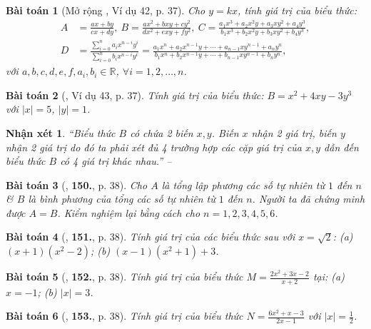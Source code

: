 \documentclass{article}
\numberwithin{equation}{section}
\newtheorem{baitoan}{Bài toán}
\newtheorem{nhanxet}{Nhận xét}[section]
\begin{document}
\begin{baitoan}[Mở rộng \cite{Tuyen_Toan_7}, Ví dụ 42, p. 37]
	\label{mo rong Tuyen_Toan_7 vi du 42}
	Cho $y = kx$, tính giá trị của biểu thức:
	\begin{align*}
		A &= \frac{ax + by}{cx + dy},\ B = \frac{ax^2 + bxy + cy^2}{dx^2 + exy + fy^2},\ C = \frac{a_1x^3 + a_2x^2y + a_3xy^2 + a_4y^3}{b_1x^3 + b_2x^2y + b_3xy^2 + b_4y^3},\\
		D &= \frac{\sum_{i=0}^n a_ix^{n-i}y^i}{\sum_{i=0}^n b_ix^{n-i}y^i} = \frac{a_1x^n + a_2x^{n-1}y + \cdots + a_{n-1}xy^{n-1} + a_ny^n}{b_1x^n + b_2x^{n-1}y + \cdots + b_{n-1}xy^{n-1} + b_ny^n},
	\end{align*}
	với $a,b,c,d,e,f,a_i,b_i\in\mathbb{R}$, $\forall i = 1,2,\ldots,n$.
\end{baitoan}

\begin{baitoan}[\cite{Tuyen_Toan_7}, Ví dụ 43, p. 37]
	Tính giá trị của biểu thức: $B = x^2 + 4xy - 3y^3$ với $|x| = 5$, $|y| = 1$.
\end{baitoan}

\begin{nhanxet}
	``Biểu thức $B$ có chứa 2 biến $x,y$. Biến $x$ nhận 2 giá trị, biến $y$ nhận 2 giá trị do đó ta phải xét đủ 4 trường hợp các cặp giá trị của $x,y$ dẫn đến biểu thức $B$ có 4 giá trị khác nhau.'' -- \cite[p. 38]{Tuyen_Toan_7}
\end{nhanxet}

\begin{baitoan}[\cite{Tuyen_Toan_7}, \textbf{150.}, p. 38]
	Cho $A$ là tổng lập phương các số tự nhiên từ $1$ đến $n$ \& $B$ là bình phương của tổng các số tự nhiên từ $1$ đến $n$. Người ta đã chứng minh được $A = B$. Kiểm nghiệm lại bằng cách cho $n = 1,2,3,4,5,6$.
\end{baitoan}

\begin{baitoan}[\cite{Tuyen_Toan_7}, \textbf{151.}, p. 38]
	Tính giá trị của các biểu thức sau với $x = \sqrt{2}$: (a) $(x + 1)(x^2 - 2)$; (b) $(x - 1)(x^2 + 1) + 3$.
\end{baitoan}

\begin{baitoan}[\cite{Tuyen_Toan_7}, \textbf{152.}, p. 38]
	Tính giá trị của biểu thức $M = \frac{2x^2 + 3x - 2}{x + 2}$ tại: (a) $x = -1$; (b) $|x| = 3$.
\end{baitoan}

\begin{baitoan}[\cite{Tuyen_Toan_7}, \textbf{153.}, p. 38]
	Tính giá trị của biểu thức $N = \frac{6x^2 + x - 3}{2x - 1}$ với $|x| = \frac{1}{2}$.
\end{baitoan}
\end{document}

